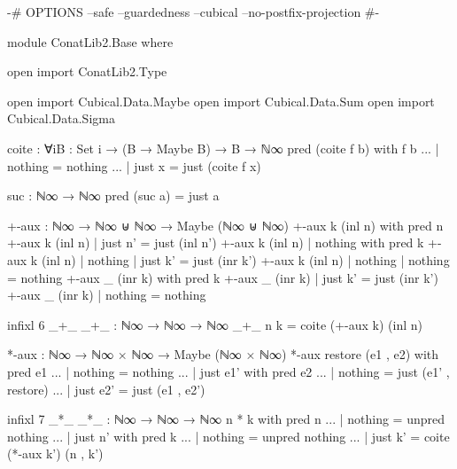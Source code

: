 \begin{code}[hide]
{-# OPTIONS --safe --guardedness --cubical --no-postfix-projection #-}

module ConatLib2.Base where

open import ConatLib2.Type

open import Cubical.Data.Maybe
open import Cubical.Data.Sum
open import Cubical.Data.Sigma

coite : ∀{i}{B : Set i} → (B → Maybe B) → B → ℕ∞
pred (coite f b) with f b
... | nothing = nothing
... | just x  = just (coite f x)

suc : ℕ∞ → ℕ∞
pred (suc a) = just a

+-aux : ℕ∞ → ℕ∞ ⊎ ℕ∞ → Maybe (ℕ∞ ⊎ ℕ∞)
+-aux k (inl n) with pred n
+-aux k (inl n) | just n' = just (inl n')
+-aux k (inl n) | nothing with pred k
+-aux k (inl n) | nothing | just k' = just (inr k')
+-aux k (inl n) | nothing | nothing = nothing
+-aux _ (inr k) with pred k
+-aux _ (inr k) | just k' = just (inr k')
+-aux _ (inr k) | nothing = nothing

infixl 6 _+_
_+_ : ℕ∞ → ℕ∞ → ℕ∞
_+_ n k = coite (+-aux k) (inl n)

*-aux : ℕ∞ → ℕ∞ × ℕ∞ → Maybe (ℕ∞ × ℕ∞)
*-aux restore (e1 , e2) with pred e1
... | nothing = nothing
... | just e1' with pred e2
... | nothing = just (e1' , restore)
... | just e2' = just (e1 , e2')

infixl 7 _*_
_*_ : ℕ∞ → ℕ∞ → ℕ∞
n * k with pred n
... | nothing = unpred nothing
... | just n' with pred k
... | nothing = unpred nothing
... | just k' = coite (*-aux k') (n , k')
\end{code}
